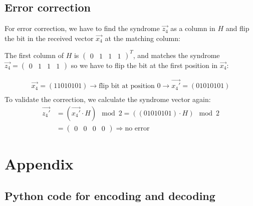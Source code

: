 \subsection*{Error correction}
For error correction, we have to find the syndrome $\vec{z_4}$ as a column in $H$ and flip the bit in the received vector $\vec{x_4}$ at the matching column:

The first column of $H$ is $\begin{pmatrix}0 &1 &1 &1\end{pmatrix}^T$, and matches the syndrome $\vec{z_4} = \begin{pmatrix}0 &1 &1 &1\end{pmatrix}$ so we have to flip the bit at the first position in $\vec{x_4}$:


\begin{align*}
  \vec{x_4} = (1 1 0 1 0 1 0 1) \rightarrow \text{flip bit at position 0} \rightarrow \vec{x_4'} = (0 1 0 1 0 1 0 1)\\
\end{align*}
To validate the correction, we calculate the syndrome vector again:
\begin{align*}
  \vec{z_4'} & = (\vec{x_4'} \cdot H) \mod 2 = ((01010101) \cdot H) \mod 2\\
   &= \begin{pmatrix}0 &0 &0 &0\end{pmatrix}
    \Rightarrow \text{no error}
\end{align*}


\section*{Appendix}
\subsection*{Python code for encoding and decoding}


